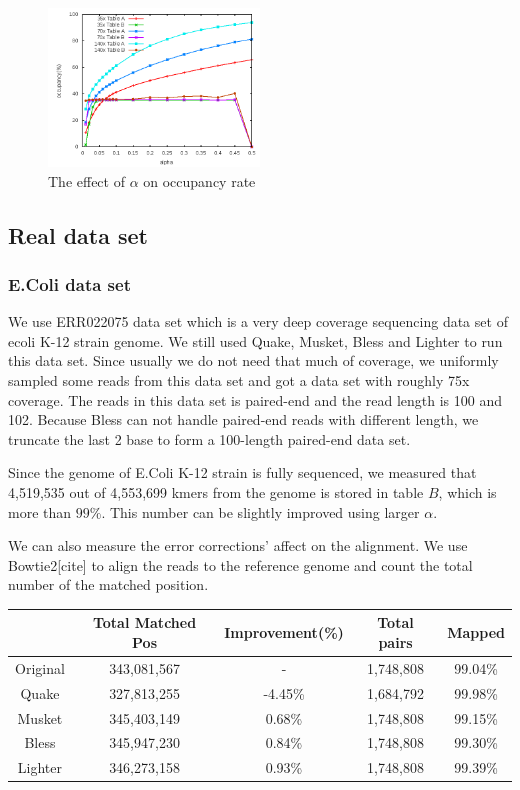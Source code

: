 \documentclass[10pt]{article}
\begin{document}
\begin{figure}[h!]
\begin{center}
\includegraphics[width=0.5\textwidth]{bloom_occupancy_alpha_all.png}
\caption{The effect of $\alpha$ on occupancy rate\label{fig:bloom_occupancy_alpha_all}}
\end{center}
\end{figure}

\subsection*{Real data set}
\subsubsection*{E.Coli data set}
We use ERR022075 data set which is a very deep coverage sequencing data set of ecoli K-12 strain genome. We still used Quake, Musket, Bless and Lighter to run this data set. Since usually we do not need that much of coverage, we uniformly sampled some reads from this data set and got a data set with roughly 75x coverage. The reads in this data set is paired-end and the read length is 100 and 102. Because Bless can not handle paired-end reads with different length, we truncate the last 2 base to form a 100-length paired-end data set.

Since the genome of E.Coli K-12 strain is fully sequenced, we measured that 4,519,535 out of 4,553,699 kmers from the genome is stored in table $B$, which is more than $99\%$. This number can be slightly improved using larger $\alpha$. 
 
We can also measure the error corrections' affect on the alignment. We use Bowtie2[cite] to align the reads to the reference genome and count the total number of the matched position.

\begin{tabular}{|c|c|c|c|c|}\hline
  & Total Matched Pos & Improvement(\%) & Total pairs & Mapped \\ \hline
Original	& 343,081,567	& - & 1,748,808	& 99.04\% \\ \hline
Quake	& 327,813,255	& -4.45\%	& 1,684,792	& 99.98\% \\ \hline
Musket	& 345,403,149	& 0.68\%	& 1,748,808	& 99.15\% \\ \hline
Bless	& 345,947,230	& 0.84\%	& 1,748,808	& 99.30\% \\ \hline
Lighter	&  346,273,158 & 0.93\%	& 1,748,808	& 99.39\% \\ \hline
\end{tabular}
\end{document}
